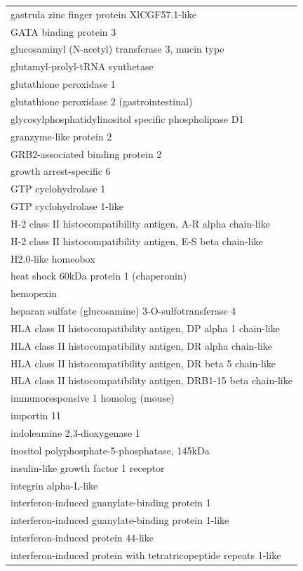 \documentclass[english]{article}\usepackage[]{graphicx}\usepackage[]{color}
\begin{document}
\begin{longtable}{l}
gastrula zinc finger protein XlCGF57.1-like \\ 
GATA binding protein 3 \\ 
glucosaminyl (N-acetyl) transferase 3, mucin type \\ 
glutamyl-prolyl-tRNA synthetase \\ 
glutathione peroxidase 1 \\ 
glutathione peroxidase 2 (gastrointestinal) \\ 
glycosylphosphatidylinositol specific phospholipase D1 \\ 
granzyme-like protein 2 \\ 
GRB2-associated binding protein 2 \\ 
growth arrest-specific 6 \\ 
GTP cyclohydrolase 1 \\ 
GTP cyclohydrolase 1-like \\ 
H-2 class II histocompatibility antigen, A-R alpha chain-like \\ 
H-2 class II histocompatibility antigen, E-S beta chain-like \\ 
H2.0-like homeobox \\ 
heat shock 60kDa protein 1 (chaperonin) \\ 
hemopexin \\ 
heparan sulfate (glucosamine) 3-O-sulfotransferase 4 \\ 
HLA class II histocompatibility antigen, DP alpha 1 chain-like \\ 
HLA class II histocompatibility antigen, DR alpha chain-like \\ 
HLA class II histocompatibility antigen, DR beta 5 chain-like \\ 
HLA class II histocompatibility antigen, DRB1-15 beta chain-like \\ 
immunoresponsive 1 homolog (mouse) \\ 
importin 11 \\ 
indoleamine 2,3-dioxygenase 1 \\ 
inositol polyphosphate-5-phosphatase, 145kDa \\ 
insulin-like growth factor 1 receptor \\ 
integrin alpha-L-like \\ 
interferon-induced guanylate-binding protein 1 \\ 
interferon-induced guanylate-binding protein 1-like \\ 
interferon-induced protein 44-like \\ 
interferon-induced protein with tetratricopeptide repeats 1-like \\ 

\end{longtable}
\end{document}
